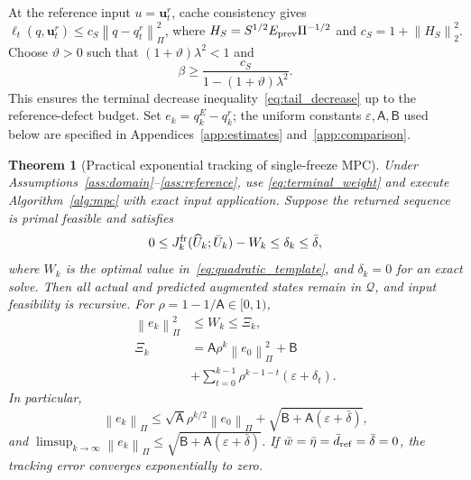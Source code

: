 \documentclass[journal]{IEEEtran}
\theoremstyle{plain}
\newtheorem{theorem}{Theorem}
\theoremstyle{definition}
\newcommand{\vu}{\mathbf{u}}
\newcommand{\norm}[1]{\left\lVert #1\right\rVert}
\begin{document}
{\color{blue}At the reference input $u=\vu_t^r$, cache consistency gives $\ell_t(q,\vu_t^r)\le c_S\norm{q-q_t^r}_\Pi^2$, where $H_S=S^{1/2}E_{\rm prev}\Pi^{-1/2}$ and $c_S=1+\norm{H_S}_2^2$. Choose $\vartheta>0$ such that $(1+\vartheta)\lambda^2<1$ and}
\begin{equation}
\beta\ge\frac{c_S}{1-(1+\vartheta)\lambda^2}.
\label{eq:terminal_weight}
\end{equation}
{\color{blue}This ensures the terminal decrease inequality~\eqref{eq:tail_decrease} up to the reference-defect budget. Set $e_k=q_k^E-q_k^r$; the uniform constants $\varepsilon,\mathsf A,\mathsf B$ used below are specified in Appendices~\ref{app:estimates} and~\ref{app:comparison}.}

\begin{theorem}[Practical exponential tracking of single-freeze MPC]
\label{thm:tracking}
Under Assumptions~\ref{ass:domain}--\ref{ass:reference}, use \eqref{eq:terminal_weight} and execute Algorithm~\ref{alg:mpc} with exact input application. Suppose the returned sequence is primal feasible and satisfies
\begin{equation}
0\le J_k^{\rm fr}(\widehat U_k;\bar U_k)-W_k
\le\delta_k\le\bar\delta,
\label{eq:solver_gap}
\end{equation}
where $W_k$ is the optimal value in~\eqref{eq:quadratic_template}, and $\delta_k=0$ for an exact solve. Then all actual and predicted augmented states remain in $\mathcal Q$, and input feasibility is recursive. For $\rho=1-1/\mathsf A\in[0,1)$,
\begin{equation}
\begin{split}
\norm{e_k}_\Pi^2&\le W_k\le\Xi_k,\\
\Xi_k&=\mathsf A\rho^k\norm{e_0}_\Pi^2+\mathsf B\\
&+\sum_{t=0}^{k-1}\rho^{k-1-t}(\varepsilon+\delta_t).
\end{split}
\label{eq:squared_tracking_bound}
\end{equation}
In particular,
\begin{equation}
\norm{e_k}_\Pi\le\sqrt{\mathsf A}\rho^{k/2}\norm{e_0}_\Pi
+\sqrt{\mathsf B+\mathsf A(\varepsilon+\bar\delta)},
\label{eq:practical_tracking}
\end{equation}
and $\limsup_{k\to\infty}\norm{e_k}_\Pi\le
\sqrt{\mathsf B+\mathsf A(\varepsilon+\bar\delta)}$.
If $\bar w=\bar\eta=\bar d_{\rm ref}=\bar\delta=0$, the tracking error converges exponentially to zero.
\end{theorem}
\end{document}
